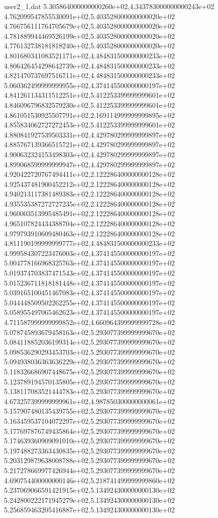 \begin{filecontents}{user2_1.dat}
5.305864000000000260e+02,4.343783000000000243e+02
4.762099547855530091e+02,5.403528000000000020e+02
4.766756111764705679e+02,5.403528000000000020e+02
4.781889944469526199e+02,5.403528000000000020e+02
4.776132738181818240e+02,5.403528000000000020e+02
4.801680341083521171e+02,4.484831500000000233e+02
4.806426454298642739e+02,4.484831500000000233e+02
4.821470737697516711e+02,4.484831500000000233e+02
5.060362499999999955e+02,4.374145500000000197e+02
4.841261134311512251e+02,5.412253399999999601e+02
4.846096796832579230e+02,5.412253399999999601e+02
4.861051530925507791e+02,2.169114999999999895e+02
4.855834062727272453e+02,5.412253399999999601e+02
4.880841927539503331e+02,4.429780299999999897e+02
4.885767139366515721e+02,4.429780299999999897e+02
4.900632324153498303e+02,4.429780299999999897e+02
4.899068599999999947e+02,4.429780299999999897e+02
4.920422720767494411e+02,2.122286400000000128e+02
4.925437481900452212e+02,2.122286400000000128e+02
4.940213117381489383e+02,2.122286400000000128e+02
4.935535387272727235e+02,2.122286400000000128e+02
4.960003513995485491e+02,2.122286400000000128e+02
4.965107824434388704e+02,2.122286400000000128e+02
4.979793910609480463e+02,2.122286400000000128e+02
4.811190199999999777e+02,4.484831500000000233e+02
4.999584307223476003e+02,4.374145500000000197e+02
5.004778166968325763e+02,4.374145500000000197e+02
5.019374703837471543e+02,4.374145500000000197e+02
5.015236711818181448e+02,4.374145500000000197e+02
5.039165100451467083e+02,4.374145500000000197e+02
5.044448509502262255e+02,4.374145500000000197e+02
5.058955497065462623e+02,4.374145500000000197e+02
4.711587999999999852e+02,4.660964399999999728e+02
5.078745893679458163e+02,5.293077399999999670e+02
5.084118852036199314e+02,5.293077399999999670e+02
5.098536290293453703e+02,5.293077399999999670e+02
5.094938036363636229e+02,5.293077399999999670e+02
5.118326686907448675e+02,5.293077399999999670e+02
5.123789194570135805e+02,5.293077399999999670e+02
5.138117083521444783e+02,5.293077399999999670e+02
4.673257399999999961e+02,4.987850300000000061e+02
5.157907480135439755e+02,5.293077399999999670e+02
5.163459537104072297e+02,5.293077399999999670e+02
5.177697876749435864e+02,5.293077399999999670e+02
5.174639360909091010e+02,5.293077399999999670e+02
5.197488273363430835e+02,5.293077399999999670e+02
5.203129879638008788e+02,5.293077399999999670e+02
5.217278669977426944e+02,5.293077399999999670e+02
4.690754400000000146e+02,5.218741499999999860e+02
5.237069066591421915e+02,5.134924300000000130e+02
5.242800222171945279e+02,5.134924300000000130e+02
5.256859463205416887e+02,5.134924300000000130e+02

\end{filecontents}
